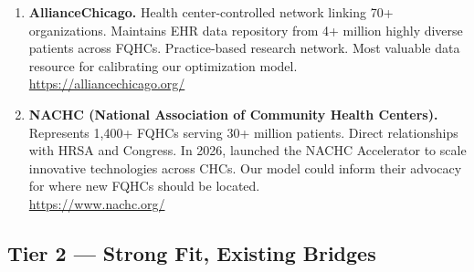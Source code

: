 \documentclass[11pt]{article}
\begin{document}
\begin{enumerate}
\item \textbf{AllianceChicago.}
Health center-controlled network linking 70+ organizations. Maintains EHR data repository from 4+ million highly diverse patients across FQHCs. Practice-based research network. Most valuable data resource for calibrating our optimization model. \\
\url{https://alliancechicago.org/}

\item \textbf{NACHC (National Association of Community Health Centers).}
Represents 1,400+ FQHCs serving 30+ million patients. Direct relationships with HRSA and Congress. In 2026, launched the NACHC Accelerator to scale innovative technologies across CHCs. Our model could inform their advocacy for where new FQHCs should be located. \\
\url{https://www.nachc.org/}

\end{enumerate}

\subsection*{Tier 2 — Strong Fit, Existing Bridges}
\end{document}
